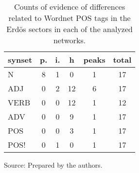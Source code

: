 \begin{table}[h!]
\begin{center}
\caption{Counts of evidence of differences related to Wordnet POS tags in the Erd\"os sectors in each of the analyzed networks.}
\begin{tabular}{| l || c | c | c || c | c |}\hline
{\bf synset} & {\bf p.} & {\bf i.} & {\bf h} & {\bf peaks} & {\bf total} \\\hline\hline
N & 8  & 1  & 0  & 1  & 17 \\\hline
ADJ & 0  & 2  & 12  & 6  & 17 \\\hline
VERB & 0  & 0  & 12  & 1  & 12 \\\hline
ADV & 0  & 0  & 9  & 1  & 17 \\\hline\hline
POS & 0  & 0  & 3  & 1  & 17 \\\hline
POS! & 0  & 1  & 0  & 1  & 17 \\\hline
\end{tabular}
\begin{flushleft}
		Source: Prepared by the authors.\
\end{flushleft}
\end{center}
\end{table}
